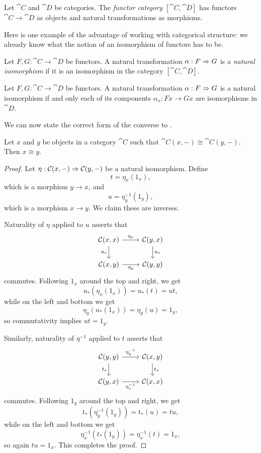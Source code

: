 \begin{dfn}\label{def:functor category}
  Let $\cat{C}$ and $\cat{D}$ be categories. The \emph{functor category}
  $[\cat{C}, \cat{D}]$ has functors $\cat{C}\to\cat{D}$ as objects and natural
  transformations as morphisms.
\end{dfn}

Here is one example of the advantage of working with categorical structure: we
already know what the notion of an isomorphism of functors has to be.

\begin{dfn}\label{def:natural isomorphism}
  Let $F,G:\cat{C}\to\cat{D}$ be functors. A natural transformation $\alpha: F\Rightarrow G$ is a \emph{natural isomorphism} if
  it is an isomorphism in the category $[\cat{C}, \cat{D}]$.
\end{dfn}

\begin{prop}
  Let $F,G:\cat{C}\to\cat{D}$ be functors. A natural transformation $\alpha:
  F\Rightarrow G$ is a natural isomorphism if and only each of its components $\alpha_x:
  Fx\to Gx$ are isomorphisms in $\cat{D}$.
\end{prop}

We can now state the correct form of the converse to .

\begin{thm}\label{thm:hom-iso-implies-iso}
  Let $x$ and $y$ be objects in a category $\cat{C}$ such that $\cat{C}(x,
  -)\cong\cat{C}(y, -)$. Then $x\cong y$.
\end{thm}

\begin{proof}
  Let $\eta: {\mathcal{C}}(x, -)\Rightarrow{\mathcal{C}}(y, -)$ be a natural isomorphism. Define \[
    t = \eta_x(1_x),
    \] which is a morphism $y\to x$, and \[
    u = \eta_y^{-1}(1_y),
  \]
  which is a morphism $x\to y$. We claim these are inverses.

  Naturality of $\eta$ applied to $u$ asserts that \[
    \begin{tikzcd}
      \cat{C}(x, x)\ar[r, "\eta_x"]\ar[d, "u_*"'] & \cat{C}(y, x)\ar[d, "u_*"] \\
      \cat{C}(x, y)\ar[r, "\eta_y"'] & \cat{C}(y, y)
    \end{tikzcd}
  \]
  commutes. Following $1_x$ around the top and right, we get \[
    u_*(\eta_x(1_x)) = u_*(t) = ut,
  \] while on the left and bottom we get \[
    \eta_y(u_*(1_x)) = \eta_y(u) = 1_y,
  \]
  so commutativity implies $ut = 1_y$.

  Similarly, naturality of $\eta^{-1}$ applied to $t$ asserts that \[
    \begin{tikzcd}
      \cat{C}(y, y)\ar[r, "\eta_y^{-1}"]\ar[d, "t_*"'] & \cat{C}(x, y)\ar[d, "t_*"] \\
      \cat{C}(y, x)\ar[r, "\eta_x^{-1}"'] & \cat{C}(x, x)
    \end{tikzcd}
  \]
  commutes. Following $1_y$ around the top and right, we get \[
    t_*(\eta_y^{-1}(1_y)) = t_*(u) = tu,
  \] while on the left and bottom we get \[
    \eta_x^{-1}(t_*(1_y)) = \eta_x^{-1}(t) = 1_x,
  \]
  so again $tu = 1_x$. This completes the proof.
\end{proof}

